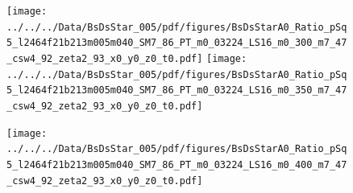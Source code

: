 \documentclass[a4paper,10pt]{article}
\begin{document}
\clearpage
\begin{figure}[p]
 \texttt{[image: ../../../Data/BsDsStar\_005/pdf/figures/BsDsStarA0\_Ratio\_pSq5\_l2464f21b213m005m040\_SM7\_86\_PT\_m0\_03224\_LS16\_m0\_300\_m7\_47\_csw4\_92\_zeta2\_93\_x0\_y0\_z0\_t0.pdf]} 
 \texttt{[image: ../../../Data/BsDsStar\_005/pdf/figures/BsDsStarA0\_Ratio\_pSq5\_l2464f21b213m005m040\_SM7\_86\_PT\_m0\_03224\_LS16\_m0\_350\_m7\_47\_csw4\_92\_zeta2\_93\_x0\_y0\_z0\_t0.pdf]} 
 \end{figure}
\begin{figure}[p]
 \texttt{[image: ../../../Data/BsDsStar\_005/pdf/figures/BsDsStarA0\_Ratio\_pSq5\_l2464f21b213m005m040\_SM7\_86\_PT\_m0\_03224\_LS16\_m0\_400\_m7\_47\_csw4\_92\_zeta2\_93\_x0\_y0\_z0\_t0.pdf]} 
 \end{figure}
\clearpage
\end{document}
